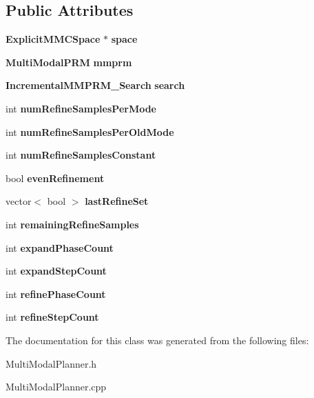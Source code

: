 \subsection*{Public Attributes}
\begin{DoxyCompactItemize}
\item 
{\bf Explicit\+M\+M\+C\+Space} $\ast$ {\bfseries space}\label{classIncrementalMMPRM__Explicit_aaefec825a64431af3d8a6e4422a45467}

\item 
{\bf Multi\+Modal\+P\+RM} {\bfseries mmprm}\label{classIncrementalMMPRM__Explicit_a3db1fb92b108d13df894419954ba7add}

\item 
{\bf Incremental\+M\+M\+P\+R\+M\+\_\+\+Search} {\bfseries search}\label{classIncrementalMMPRM__Explicit_a48a487c7b5380ee259ba9837712f7732}

\item 
int {\bfseries num\+Refine\+Samples\+Per\+Mode}\label{classIncrementalMMPRM__Explicit_a1ec3e16914a24d5f4fe0196ae4cdfb34}

\item 
int {\bfseries num\+Refine\+Samples\+Per\+Old\+Mode}\label{classIncrementalMMPRM__Explicit_a9ddd538bc72f806bdef240197462d65a}

\item 
int {\bfseries num\+Refine\+Samples\+Constant}\label{classIncrementalMMPRM__Explicit_a9768201de09444b7fe6f4c7fc1b6d3e6}

\item 
bool {\bfseries even\+Refinement}\label{classIncrementalMMPRM__Explicit_a2068d1c71b03529bdd7cf87d8c040b0c}

\item 
vector$<$ bool $>$ {\bfseries last\+Refine\+Set}\label{classIncrementalMMPRM__Explicit_a800bfa8ae2b6a8cf7027c3773c53c085}

\item 
int {\bfseries remaining\+Refine\+Samples}\label{classIncrementalMMPRM__Explicit_a107cba3c86a56a026c56cdea36cd6a57}

\item 
int {\bfseries expand\+Phase\+Count}\label{classIncrementalMMPRM__Explicit_a6d4d92740fa775d431b289f4a45630e9}

\item 
int {\bfseries expand\+Step\+Count}\label{classIncrementalMMPRM__Explicit_ab424e880d9824bbe440b7e90196537c1}

\item 
int {\bfseries refine\+Phase\+Count}\label{classIncrementalMMPRM__Explicit_a90a99c84291dd77272a07d765ebb3428}

\item 
int {\bfseries refine\+Step\+Count}\label{classIncrementalMMPRM__Explicit_a9854ae93c3cb6e71fc49e27461866bad}

\end{DoxyCompactItemize}


The documentation for this class was generated from the following files\+:\begin{DoxyCompactItemize}
\item 
Multi\+Modal\+Planner.\+h\item 
Multi\+Modal\+Planner.\+cpp\end{DoxyCompactItemize}
